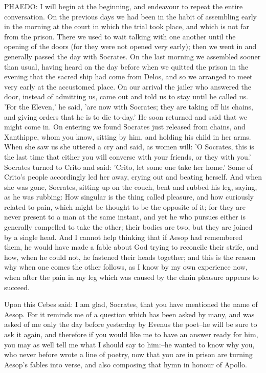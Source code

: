 PHAEDO: I will begin at the beginning, and endeavour to repeat the
entire conversation. On the previous days we had been in the habit of
assembling early in the morning at the court in which the trial took
place, and which is not far from the prison. There we used to wait
talking with one another until the opening of the doors (for they were
not opened very early); then we went in and generally passed the day
with Socrates. On the last morning we assembled sooner than usual,
having heard on the day before when we quitted the prison in the evening
that the sacred ship had come from Delos, and so we arranged to meet
very early at the accustomed place. On our arrival the jailer who
answered the door, instead of admitting us, came out and told us to stay
until he called us. 'For the Eleven,' he said, 'are now with Socrates;
they are taking off his chains, and giving orders that he is to die
to-day.' He soon returned and said that we might come in. On entering we
found Socrates just released from chains, and Xanthippe, whom you know,
sitting by him, and holding his child in her arms. When she saw us she
uttered a cry and said, as women will: 'O Socrates, this is the last
time that either you will converse with your friends, or they with you.'
Socrates turned to Crito and said: 'Crito, let some one take her home.'
Some of Crito's people accordingly led her away, crying out and beating
herself. And when she was gone, Socrates, sitting up on the couch, bent
and rubbed his leg, saying, as he was rubbing: How singular is the
thing called pleasure, and how curiously related to pain, which might be
thought to be the opposite of it; for they are never present to a man at
the same instant, and yet he who pursues either is generally compelled
to take the other; their bodies are two, but they are joined by a single
head. And I cannot help thinking that if Aesop had remembered them, he
would have made a fable about God trying to reconcile their strife, and
how, when he could not, he fastened their heads together; and this is
the reason why when one comes the other follows, as I know by my own
experience now, when after the pain in my leg which was caused by the
chain pleasure appears to succeed.

Upon this Cebes said: I am glad, Socrates, that you have mentioned the
name of Aesop. For it reminds me of a question which has been asked by
many, and was asked of me only the day before yesterday by Evenus the
poet--he will be sure to ask it again, and therefore if you would like
me to have an answer ready for him, you may as well tell me what I
should say to him:--he wanted to know why you, who never before wrote
a line of poetry, now that you are in prison are turning Aesop's fables
into verse, and also composing that hymn in honour of Apollo.

